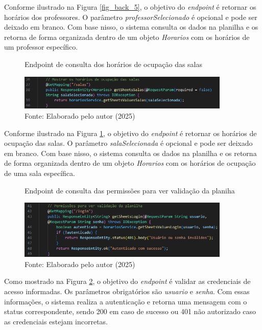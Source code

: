 \begin{itemize}
    Conforme ilustrado na Figura \ref{fig_back_5}, o objetivo do \textit{endpoint} é retornar os horários dos professores. O parâmetro \textit{professorSelecionado} é opcional e pode ser deixado em branco. Com base nisso, o sistema consulta os dados na planilha e os retorna de forma organizada dentro de um objeto \textit{Horarios} com os horários de um professor específico.

    \begin{figure}[htb]
        \centering
        \caption{Endpoint de consulta dos horários de ocupação das salas}
        \includegraphics[width=0.9\textwidth]{Figuras/back-6.png}
        \caption*{Fonte: Elaborado pelo autor (2025)}
        \label{fig_back_6}
    \end{figure}

    Conforme ilustrado na Figura \ref{fig_back_6}, o objetivo do \textit{endpoint} é retornar os horários de ocupação das salas. O parâmetro \textit{salaSelecionada} é opcional e pode ser deixado em branco. Com base nisso, o sistema consulta os dados na planilha e os retorna de forma organizada dentro de um objeto \textit{Horarios} com os horários de ocupação de uma sala específica.

    \begin{figure}[H]
        \centering
        \caption{Endpoint de consulta das permissões para ver validação da planiha}
        \includegraphics[width=0.9\textwidth]{Figuras/back-7.png}
        \caption*{Fonte: Elaborado pelo autor (2025)}
        \label{fig_back_7}
    \end{figure}

    Como mostrado na Figura \ref{fig_back_7}, o objetivo do \textit{endpoint} é validar as credenciais de acesso informadas. Os parâmetros obrigatórios são \textit{usuario} e \textit{senha}. Com essas informações, o sistema realiza a autenticação e retorna uma mensagem com o status correspondente, sendo 200 em caso de sucesso ou 401 não autorizado caso as credenciais estejam incorretas.


\end{itemize}
